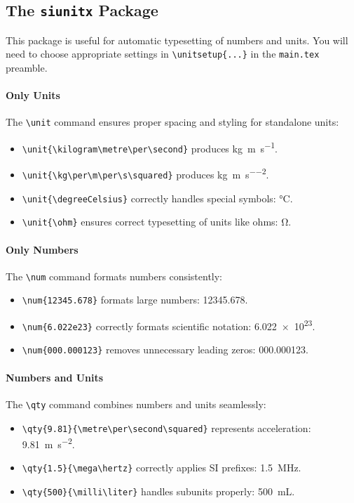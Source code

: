 \subsection{The \texttt{siunitx} Package}

    This package is useful for automatic typesetting of numbers and units. You will need to choose appropriate settings in \verb|\unitsetup{...}| in the \verb|main.tex| preamble. %

    \paragraph*{Only Units}
        The \verb|\unit| command ensures proper spacing and styling for standalone units:
        \begin{itemize}
            \item \verb|\unit{\kilogram\metre\per\second}| produces \unit{\kilogram\metre\per\second}.
            \item \verb|\unit{\kg\per\m\per\s\squared}| produces \unit{\kg\per\m\per\s\squared}.
            \item \verb|\unit{\degreeCelsius}| correctly handles special symbols: \unit{\degreeCelsius}.
            \item \verb|\unit{\ohm}| ensures correct typesetting of units like ohms: \unit{\ohm}.
        \end{itemize}

    \paragraph*{Only Numbers}
        The \verb|\num| command formats numbers consistently:
        \begin{itemize}
            \item \verb|\num{12345.678}| formats large numbers: \num{12345.678}.
            \item \verb|\num{6.022e23}| correctly formats scientific notation: \num{6.022e23}.
            \item \verb|\num{000.000123}| removes unnecessary leading zeros: \num{000.000123}.
        \end{itemize}

    \paragraph*{Numbers and Units}
        The \verb|\qty| command combines numbers and units seamlessly:
        \begin{itemize}
            \item \verb|\qty{9.81}{\metre\per\second\squared}| represents acceleration: \qty{9.81}{\metre\per\second\squared}.
            \item \verb|\qty{1.5}{\mega\hertz}| correctly applies SI prefixes: \qty{1.5}{\mega\hertz}.
            \item \verb|\qty{500}{\milli\liter}| handles subunits properly: \qty{500}{\milli\liter}.
        \end{itemize}

